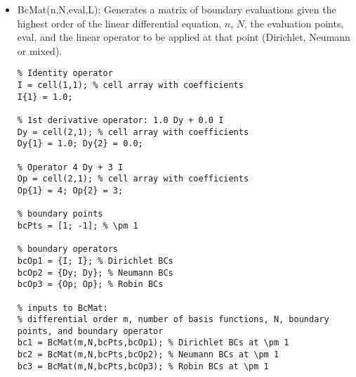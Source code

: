 \documentclass[%
secnumarabic,%
 amssymb, amsmath,%
 aps,prf,superscriptaddress,longbibliography
frontmatterverbose,
]{revtex4-2}
\begin{document}
\begin{itemize}
  \item \textsf{BcMat(n,N,eval,L)}: Generates a matrix of boundary evaluations given the highest order of the linear differential equation, $n$, $N$, the evaluation points, \textsf{eval}, and the linear operator to be applied at that point (Dirichlet, Neumann or mixed). %
  
\begin{lstlisting}
% Identity operator
I = cell(1,1); % cell array with coefficients
I{1} = 1.0;

% 1st derivative operator: 1.0 Dy + 0.0 I
Dy = cell(2,1); % cell array with coefficients
Dy{1} = 1.0; Dy{2} = 0.0;

% Operator 4 Dy + 3 I
Op = cell(2,1); % cell array with coefficients
Op{1} = 4; Op{2} = 3;

% boundary points 
bcPts = [1; -1]; % \pm 1

% boundary operators
bcOp1 = {I; I}; % Dirichlet BCs 
bcOp2 = {Dy; Dy}; % Neumann BCs
bcOp3 = {Op; Op}; % Robin BCs 

% inputs to BcMat:
% differential order m, number of basis functions, N, boundary points, and boundary operator
bc1 = BcMat(m,N,bcPts,bcOp1); % Dirichlet BCs at \pm 1
bc2 = BcMat(m,N,bcPts,bcOp2); % Neumann BCs at \pm 1
bc3 = BcMat(m,N,bcPts,bcOp3); % Robin BCs at \pm 1
\end{lstlisting}
  
\end{itemize}
\end{document}
